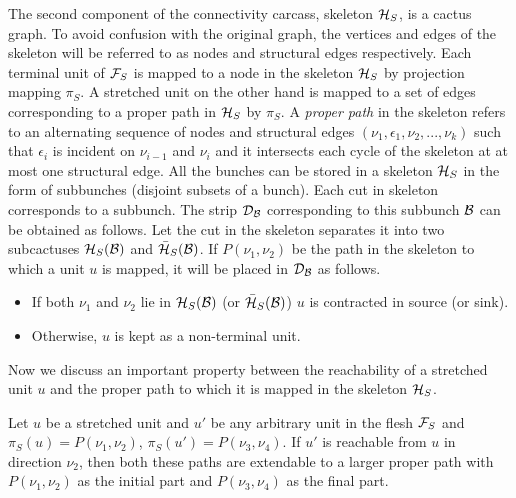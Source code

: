 The second component of the connectivity carcass, skeleton ${\cal H}_S$, is a cactus graph. 
To avoid confusion with the original graph, the vertices and edges of the skeleton will be referred to as nodes and structural edges respectively. 
Each terminal unit of ${\cal F}_S$ is mapped to a node in the skeleton ${\cal H}_S$ by projection mapping ${\pi}_S$. A stretched unit on the other hand is mapped to a set of edges corresponding to a proper path in ${\cal H}_S$ by ${\pi}_S$. A \textit{proper path} in the skeleton refers to an alternating sequence of nodes and structural edges $(\nu_1,\epsilon_1,\nu_2,...,\nu_k)$ such that $\epsilon_i$ is incident on $\nu_{i-1}$ and $\nu_i$ and it intersects each cycle of the skeleton at at most one structural edge. 
All the bunches can be stored in a skeleton ${\cal H}_S$ in the form of subbunches (disjoint subsets of a bunch). Each cut in skeleton corresponds to a subbunch. The strip ${\cal D}_{\cal B}$ corresponding to this subbunch $\cal B$ can be obtained as follows. Let the cut in the skeleton separates it into two subcactuses ${\cal H}_S(\cal B)$ and ${\bar {\cal H}_S(\cal B)}$. If $P(\nu_1,\nu_2)$ be the path in the skeleton to which a unit $u$ is mapped, it will be placed in ${\cal D}_{\cal B}$ as follows.
\begin{itemize}
    \item If both $\nu_1$ and $\nu_2$ lie in ${\cal H}_S(\cal B)$ (or ${\bar {\cal H}_S(\cal B)}$) $u$ is contracted in source (or sink).
    \item Otherwise, $u$ is kept as a non-terminal unit.
\end{itemize}


Now we discuss an important property between the reachability of a stretched unit $u$ and the proper path to which it is mapped in the skeleton ${\cal H}_S$.

\begin{lemma}
Let $u$ be a stretched unit and $u'$ be any arbitrary unit in the flesh ${\cal F}_S$ and $\pi_S(u) = P(\nu_1,\nu_2)$, $\pi_S(u') = P(\nu_3,\nu_4)$. If $u'$ is reachable from $u$ in direction $\nu_2$, then both these paths are extendable to a larger proper path with $P(\nu_1,\nu_2)$ as the initial part and $P(\nu_3,\nu_4)$ as the final part.
\label{lem:path-extendable}
\end{lemma}

